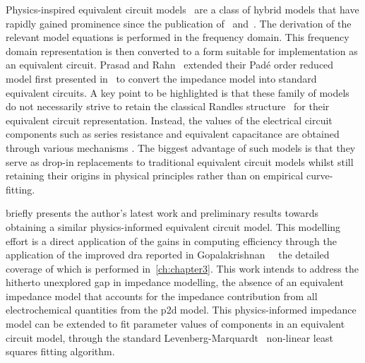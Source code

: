 Physics-inspired equivalent circuit models~\cite{Merla2018,Prasad2014,Zhang2017}
are  a  class  of  hybrid  models that  have  rapidly  gained  prominence  since
the publication  of~\cite{Jokar2016} and~\cite{Fan2015}.  The derivation  of the
relevant model  equations is performed  in the frequency domain.  This frequency
domain representation  is then converted  to a form suitable  for implementation
as  an  equivalent circuit.  Prasad  and  Rahn~\cite{Prasad2014} extended  their
Padé order  reduced model first  presented in~\cite{Prasad2013} to  convert the
impedance model into standard equivalent circuits. A key point to be highlighted
is  that  these  family of  models  do  not  necessarily  strive to  retain  the
classical  Randles  structure~\cite{Randles1947}  for their  equivalent  circuit
representation. Instead, the values of the electrical circuit components such as
series  resistance  and  equivalent  capacitance are  obtained  through  various
mechanisms . The biggest advantage of
such models is that they serve as drop-in replacements to traditional equivalent
circuit  models whilst  still  retaining their  origins  in physical  principles
rather than on empirical curve-fitting.

  briefly presents  the author's  latest work  and preliminary
results  towards   obtaining  a  similar  physics-informed   equivalent  circuit
model.  This  modelling  effort  is  a   direct  application  of  the  gains  in
computing  efficiency   through  the  application  of   the  improved  \gls{dra}
reported   in   Gopalakrishnan~\etal{}~\cite{Gopalakrishnan2017}  the   detailed
coverage  of  which  is   performed  in~\cref{ch:chapter3}.  This  work  intends
to  address  the hitherto  unexplored  gap  in  impedance modelling,  \ie{}  the
absence  of  an equivalent  impedance  model  that  accounts for  the  impedance
contribution from all electrochemical quantities  from the \gls{p2d} model. This
physics-informed  impedance  model  can  be extended  to  fit  parameter  values
of  components  in an  equivalent  circuit  model,  \eg{} through  the  standard
Levenberg-Marquardt~\cite{Levenberg1944, Marquardt1963} non-linear least squares
fitting algorithm.

